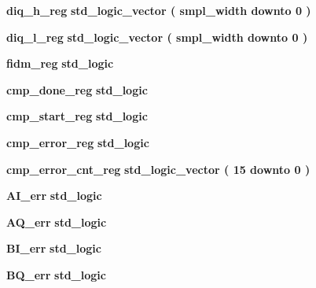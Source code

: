  \begin{DoxyCompactItemize}
\item 
{\bf diq\+\_\+h\+\_\+reg} {\bfseries \textcolor{comment}{std\+\_\+logic\+\_\+vector}\textcolor{vhdlchar}{ }\textcolor{vhdlchar}{(}\textcolor{vhdlchar}{ }\textcolor{vhdlchar}{ }\textcolor{vhdlchar}{ }\textcolor{vhdlchar}{ }{\bfseries {\bf smpl\+\_\+width}} \textcolor{vhdlchar}{ }\textcolor{keywordflow}{downto}\textcolor{vhdlchar}{ }\textcolor{vhdlchar}{ } \textcolor{vhdldigit}{0} \textcolor{vhdlchar}{ }\textcolor{vhdlchar}{)}\textcolor{vhdlchar}{ }} 
\item 
{\bf diq\+\_\+l\+\_\+reg} {\bfseries \textcolor{comment}{std\+\_\+logic\+\_\+vector}\textcolor{vhdlchar}{ }\textcolor{vhdlchar}{(}\textcolor{vhdlchar}{ }\textcolor{vhdlchar}{ }\textcolor{vhdlchar}{ }\textcolor{vhdlchar}{ }{\bfseries {\bf smpl\+\_\+width}} \textcolor{vhdlchar}{ }\textcolor{keywordflow}{downto}\textcolor{vhdlchar}{ }\textcolor{vhdlchar}{ } \textcolor{vhdldigit}{0} \textcolor{vhdlchar}{ }\textcolor{vhdlchar}{)}\textcolor{vhdlchar}{ }} 
\item 
{\bf fidm\+\_\+reg} {\bfseries \textcolor{comment}{std\+\_\+logic}\textcolor{vhdlchar}{ }} 
\item 
{\bf cmp\+\_\+done\+\_\+reg} {\bfseries \textcolor{comment}{std\+\_\+logic}\textcolor{vhdlchar}{ }} 
\item 
{\bf cmp\+\_\+start\+\_\+reg} {\bfseries \textcolor{comment}{std\+\_\+logic}\textcolor{vhdlchar}{ }} 
\item 
{\bf cmp\+\_\+error\+\_\+reg} {\bfseries \textcolor{comment}{std\+\_\+logic}\textcolor{vhdlchar}{ }} 
\item 
{\bf cmp\+\_\+error\+\_\+cnt\+\_\+reg} {\bfseries \textcolor{comment}{std\+\_\+logic\+\_\+vector}\textcolor{vhdlchar}{ }\textcolor{vhdlchar}{(}\textcolor{vhdlchar}{ }\textcolor{vhdlchar}{ } \textcolor{vhdldigit}{15} \textcolor{vhdlchar}{ }\textcolor{keywordflow}{downto}\textcolor{vhdlchar}{ }\textcolor{vhdlchar}{ } \textcolor{vhdldigit}{0} \textcolor{vhdlchar}{ }\textcolor{vhdlchar}{)}\textcolor{vhdlchar}{ }} 
\item 
{\bf A\+I\+\_\+err} {\bfseries \textcolor{comment}{std\+\_\+logic}\textcolor{vhdlchar}{ }} 
\item 
{\bf A\+Q\+\_\+err} {\bfseries \textcolor{comment}{std\+\_\+logic}\textcolor{vhdlchar}{ }} 
\item 
{\bf B\+I\+\_\+err} {\bfseries \textcolor{comment}{std\+\_\+logic}\textcolor{vhdlchar}{ }} 
\item 
{\bf B\+Q\+\_\+err} {\bfseries \textcolor{comment}{std\+\_\+logic}\textcolor{vhdlchar}{ }} 

\end{DoxyCompactItemize}
